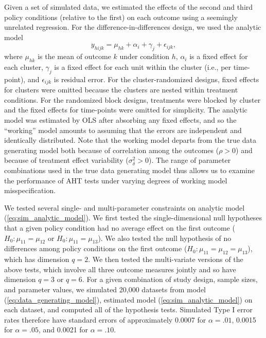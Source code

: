 \documentclass[12pt]{article}\usepackage[]{graphicx}\usepackage[]{color}
\begin{document}
Given a set of simulated data, we estimated the effects of the second and third policy conditions (relative to the first) on each outcome using a seemingly unrelated regression. 
For the difference-in-differences design, we used the analytic model
\begin{equation}
\label{eq:sim_analytic_model}
y_{hijk} = \mu_{hk} + \alpha_i + \gamma_j + \epsilon_{ijk},
\end{equation}
where $\mu_{hk}$ is the mean of outcome $k$ under condition $h$, $\alpha_i$ is a fixed effect for each cluster, $\gamma_j$ is a fixed effect for each unit within the cluster (i.e., per time-point), and $\epsilon_{ijk}$ is residual error. 
For the cluster-randomized designs, fixed effects for clusters were omitted because the clusters are nested within treatment conditions. 
For the randomized block designs, treatments were blocked by cluster and the fixed effects for time-points were omitted for simplicity.
The analytic model was estimated by OLS after absorbing any fixed effects, and so the ``working'' model amounts to assuming that the errors are independent and identically distributed. 
Note that the working model departs from the true data generating model both because of correlation among the outcomes ($\rho > 0$) and because of treatment effect variability ($\sigma_\delta^2 > 0$). 
The range of parameter combinations used in the true data generating model thus allows us to examine the performance of AHT tests under varying degrees of working model misspecification. 



We tested several single- and multi-parameter constraints on analytic model (\ref{eq:sim_analytic_model}). 
We first tested the single-dimensional null hypotheses that a given policy condition had no average effect on the first outcome ($H_0: \mu_{11} = \mu_{12}$ or $H_0: \mu_{11} = \mu_{13}$). 
We also tested the null hypothesis of no differences among policy conditions on the first outcome ($H_0: \mu_{11} = \mu_{12} = \mu_{13}$), which has dimension $q = 2$. 
We then tested the multi-variate versions of the above tests, which involve all three outcome measures jointly and so have dimension $q = 3$ or $q = 6$. 
For a given combination of study design, sample sizes, and parameter values, we simulated 20,000 datasets from model (\ref{eq:data_generating_model}), estimated model (\ref{eq:sim_analytic_model}) on each dataset, and computed all of the hypothesis tests. 
Simulated Type I error rates therefore have standard errors of approximately 0.0007 for $\alpha = .01$, 0.0015 for $\alpha = .05$, and 0.0021 for $\alpha = .10$. 
\end{document}
